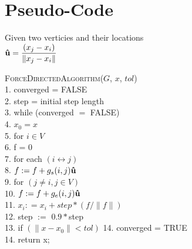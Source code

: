 \section{Pseudo-Code}
Given two verticies and their locations \\
$\boldsymbol{\hat{\textbf{u}}} = \dfrac{(x_j-x_i)}{\|x_j-x_i\|}$
\begin{algorithm}
	\textsc{ForceDirectedAlgorithm}($G$, $x$, $tol$)\\
	1.\hspace{1em} converged = FALSE\\
	2.\hspace{1em} step = initial step length\\
	3.\hspace{1em} while (converged $=$ FALSE) \\
	4.\hspace{2em} $x_0 = x$\\
	5.\hspace{2em} for $i \in V$\\
	6.\hspace{3em} f = 0\\
	7.\hspace{3em} for each $(i \leftrightarrow j)$ \\
	8.\hspace{4em} $f : = f + g_s(i, j)\boldsymbol{\hat{\textbf{u}}}$\\
	9.\hspace{3em} for $(j \neq i, j \in V)$\\
	10.\hspace{4em} $f : = f + g_e(i, j)\boldsymbol{\hat{\textbf{u}}}$\\
	11.\hspace{3em} $x_i: = x_i + step * (f / \| f \|)$\\
	12.\hspace{3em} step $:=$ $0.9*$step\\
	13.\hspace{3em} if $(\|x - x_0\| < tol)$ 
	14.\hspace{3em} converged = TRUE\\
	14.\hspace{2em} return x;
\end{algorithm}